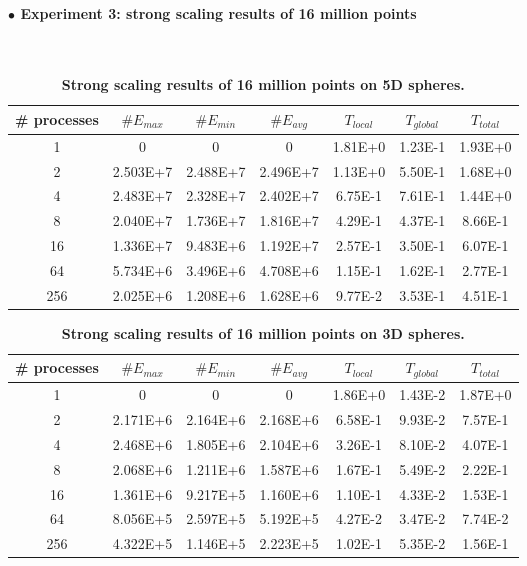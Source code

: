 \documentclass[12pt]{article}
\begin{document}
\clearpage
\paragraph{$\bullet$ \large{ Experiment 3: strong scaling results of 16 million points}}
$ $\newline
\renewcommand{\arraystretch}{1.7}
\begin{table}[h]
\centering
    \caption{\textbf{Strong scaling results of 16 million points on 5D spheres.} }
	\label{16M5D}
\begin{tabular}{ccccccc}
    \hline %
\# processes  &$\# E_{max}$   &$\# E_{min}$ &$\# E_{avg}$  &$T_{local}$  &$T_{global}$  &$T_{total}$\\
\hline\hline
1 &0 &0 &0 &1.81E+0    &1.23E-1    &1.93E+0\\
2  &2.503E+7   &2.488E+7   &2.496E+7 &1.13E+0   &5.50E-1    &1.68E+0\\
4  &2.483E+7   &2.328E+7   &2.402E+7 &6.75E-1   &7.61E-1    &1.44E+0\\
8  &2.040E+7   &1.736E+7   &1.816E+7 &4.29E-1   &4.37E-1    &8.66E-1\\
16  &1.336E+7   &9.483E+6   &1.192E+7 &2.57E-1  &3.50E-1    &6.07E-1\\
64  &5.734E+6   &3.496E+6   &4.708E+6 &1.15E-1  &1.62E-1    &2.77E-1\\
256  &2.025E+6   &1.208E+6   &1.628E+6 &9.77E-2 &3.53E-1    &4.51E-1\\
\hline
    \end{tabular}
\end{table}
\renewcommand{\arraystretch}{1.7}
\begin{table}[h]
\centering
    \caption{\textbf{Strong scaling results of 16 million points on 3D spheres.} }
	\label{16M3D}
\begin{tabular}{ccccccc}
    \hline %
\# processes  &$\# E_{max}$   &$\# E_{min}$ &$\# E_{avg}$  &$T_{local}$  &$T_{global}$  &$T_{total}$\\
\hline\hline
1 &0 &0 &0 &1.86E+0 &1.43E-2   &1.87E+0\\
2  &2.171E+6   &2.164E+6   &2.168E+6 &6.58E-1 &9.93E-2  &7.57E-1\\
4   &2.468E+6   &1.805E+6   &2.104E+6 &3.26E-1 &8.10E-2 &4.07E-1\\
8  &2.068E+6   &1.211E+6   &1.587E+6 &1.67E-1 &5.49E-2  &2.22E-1\\
16  &1.361E+6   &9.217E+5   &1.160E+6 &1.10E-1 &4.33E-2 &1.53E-1\\
64  &8.056E+5   &2.597E+5   &5.192E+5 &4.27E-2 &3.47E-2 &7.74E-2\\
256  &4.322E+5   &1.146E+5   &2.223E+5 &1.02E-1 &5.35E-2    &1.56E-1\\
\hline
    \end{tabular}
\end{table}
\end{document}

